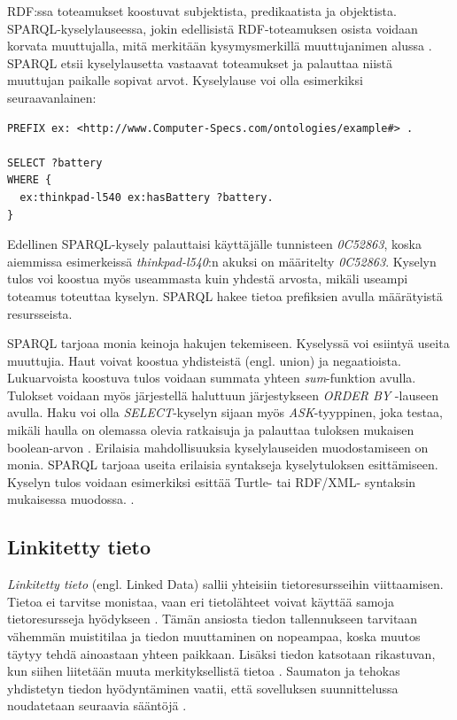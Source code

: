 \documentclass[finnish, 12pt, a4paper, elec, utf8, pdfa, online]{aaltothesis}
\begin{document}
{RDF:ssa toteamukset koostuvat subjektista, predikaatista ja objektista. SPARQL-kyselylauseessa, jokin edellisistä RDF-toteamuksen osista voidaan korvata muuttujalla, mitä merkitään kysymysmerkillä muuttujanimen alussa \cite{Antoniou}. SPARQL etsii kyselylausetta vastaavat toteamukset ja palauttaa niistä muuttujan paikalle sopivat arvot. Kyselylause voi olla esimerkiksi seuraavanlainen:
\vskip 0.5cm
\begin{lstlisting}[style=codeblock,caption={SPARQL esimerkki.},captionpos=b,label={sparql_esim}]
PREFIX ex: <http://www.Computer-Specs.com/ontologies/example#> .

SELECT ?battery
WHERE {
  ex:thinkpad-l540 ex:hasBattery ?battery.
}
\end{lstlisting}

Edellinen SPARQL-kysely palauttaisi käyttäjälle tunnisteen \textit{0C52863}, koska aiemmissa esimerkeissä \textit{thinkpad-l540}:n akuksi on määritelty \textit{0C52863}. Kyselyn tulos voi koostua myös useammasta kuin yhdestä arvosta, mikäli useampi toteamus toteuttaa kyselyn. SPARQL hakee tietoa prefiksien avulla määrätyistä resursseista.

SPARQL tarjoaa monia keinoja hakujen tekemiseen. Kyselyssä voi esiintyä useita muuttujia.
Haut voivat koostua yhdisteistä (engl. union) ja negaatioista. Lukuarvoista koostuva tulos voidaan summata yhteen \textit{sum}-funktion avulla. Tulokset voidaan myös järjestellä haluttuun järjestykseen \textit{ORDER BY} -lauseen avulla. Haku voi olla \textit{SELECT}-kyselyn sijaan myös \textit{ASK}-tyyppinen, joka testaa, mikäli haulla on olemassa olevia ratkaisuja ja palauttaa tuloksen mukaisen boolean-arvon \cite{sparql_query}. Erilaisia mahdollisuuksia kyselylauseiden muodostamiseen on monia. SPARQL tarjoaa useita erilaisia syntakseja kyselytuloksen esittämiseen. Kyselyn tulos voidaan esimerkiksi esittää Turtle- tai RDF/XML- syntaksin mukaisessa muodossa. \cite{W3C_turtle}.



\subsection{Linkitetty tieto}

\textit{Linkitetty tieto} (engl. Linked Data) sallii yhteisiin tietoresursseihin viittaamisen. Tietoa ei tarvitse monistaa, vaan eri tietolähteet voivat käyttää samoja tietoresursseja hyödykseen \cite{linked_data_finlad}. Tämän ansiosta tiedon tallennukseen tarvitaan vähemmän muistitilaa ja tiedon muuttaminen on nopeampaa, koska muutos täytyy tehdä ainoastaan yhteen paikkaan. Lisäksi tiedon katsotaan rikastuvan, kun siihen liitetään muuta merkityksellistä tietoa \cite{linked_data_finlad}. Saumaton ja tehokas yhdistetyn tiedon hyödyntäminen vaatii, että sovelluksen suunnittelussa noudatetaan seuraavia sääntöjä \cite{cambridge_linked}.

}
\end{document}
